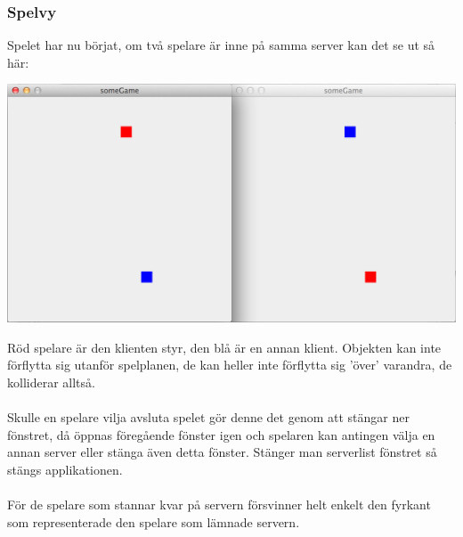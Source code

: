 \documentclass[10pt, titlepage, oneside, a4paper]{article}
\begin{document}
			\newpage
			\subsubsection{Spelvy}
			Spelet har nu börjat, om två spelare är inne på samma server kan det se ut så här:
				\begin{center}
					\includegraphics[scale=.3]{./documentation/images/scr1.png}
				\end{center}	
			Röd spelare är den klienten styr, den blå är en annan klient. Objekten kan inte förflytta sig utanför spelplanen,  de kan heller inte förflytta sig 'över' varandra, de kolliderar alltså.\\\\Skulle en spelare vilja avsluta spelet gör denne det genom att stängar ner fönstret, då öppnas föregående fönster igen och spelaren kan antingen välja en annan server eller stänga även detta fönster. Stänger man serverlist fönstret så stängs applikationen.\\\\För de spelare som stannar kvar på servern försvinner helt enkelt den fyrkant som representerade den spelare som lämnade servern.
		
\end{document}
